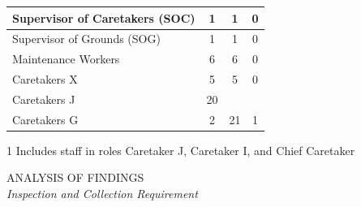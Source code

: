\begin{table}[H]
\begin{threeparttable}
\begin{tabular}{l|c|c|c|}
    \multicolumn{1}{|l|}{\cellcolor{ccfuschialight}Supervisor of Caretakers (SOC)} & 1                                                      & 1                                                                & 0                                                      \\ \hline
    \multicolumn{1}{|l|}{\cellcolor{ccfuschialight}Supervisor of Grounds (SOG)}    & 1                                                      & 1                                                                & 0                                                      \\ \hline
    \multicolumn{1}{|l|}{\cellcolor{ccfuschialight}Maintenance Workers}            & 6                                                      & 6                                                                & 0                                                       \\ \hline
    \multicolumn{1}{|l|}{\cellcolor{ccfuschialight}Caretakers X}                   & 5                                                      & 5                                                                & 0                                                      \\ \hline
    \multicolumn{1}{|l|}{\cellcolor{ccfuschialight}Caretakers J\tnote{1}}                   & 20                                                      &                                                                 &                                                         \\ \cline{1-2}
    \multicolumn{1}{|l|}{\cellcolor{ccfuschialight}Caretakers G}                   & 2                                                      & \multirow{-2}{*}{21}                                     & \multirow{-2}{*}{1}                           \\ \hline
    \end{tabular}
    
\begin{tablenotes}
\item [1] Includes staff in roles Caretaker J, Caretaker I, and Chief Caretaker
\end{tablenotes}
\end{threeparttable}
\end{table}

\pagebreak
\pagestyle{plain}
\pagecolor{ccgreen}
\pagebreak
{}
\pagestyle{fancy}
\fancyhf{}
\renewcommand{\chaptermark}[1]{\markboth{#1}{}}
\fancyfoot[LE,RO]{\thepage}
\textcolor{ccgreen}{ANALYSIS OF FINDINGS}
\\
\emph{Inspection and Collection Requirement}

